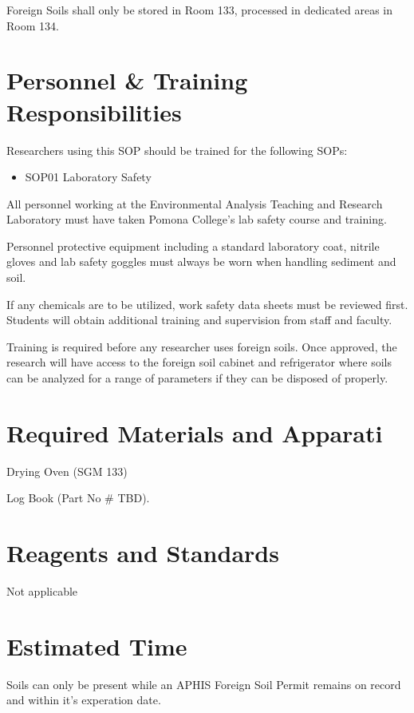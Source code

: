\documentclass[12pt]{../SOP3}\usepackage[]{graphicx}\usepackage[]{color}
\begin{document}
\NP Foreign Soils shall only be stored in Room 133, processed in dedicated areas in Room 134.


\section{Personnel \& Training Responsibilities}

\NP Researchers using this SOP should be trained for the following SOPs:

\begin{itemize}
  \item SOP01 Laboratory Safety
\end{itemize}

\NP All personnel working at the Environmental Analysis Teaching and Research Laboratory must have taken Pomona College's lab safety course and training.

\NP Personnel protective equipment including a standard laboratory coat, nitrile gloves and lab safety goggles must always be worn when handling sediment and soil. 

\NP If any chemicals are to be utilized, work safety data sheets must be reviewed first. Students will obtain additional training and supervision from staff and faculty. 

\NP Training is required before any researcher uses foreign soils. Once approved, the research will have access to the foreign soil cabinet and refrigerator where soils can be analyzed for a range of parameters if they can be disposed of properly.  

\section{Required Materials and Apparati}

\NP Drying Oven (SGM 133)

\NP Log Book (Part No \# TBD).

\section{Reagents and Standards}

\NP Not applicable

\section{Estimated Time}

\NP Soils can only be present while an APHIS Foreign Soil Permit remains on record and within it's experation date.
\end{document}
